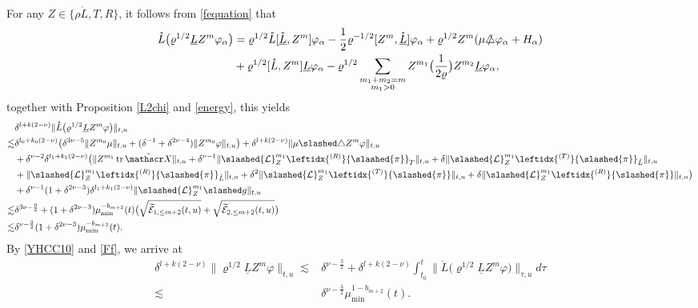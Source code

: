 \documentclass[11pt,twoside]{article}
\def\al{\alpha}
\def\de{\delta}
\def\vp{\varphi}
\def\f{\frac}
\begin{document}
For any $Z\in\{\rho\mathring L, T, R\}$, it follows from \eqref{fequation} that
\begin{equation*}
\begin{split}
 \mathring{L}\bigl(\varrho^{1/2}\underline{L}{Z}^m \vp_\al \bigr)
&=\varrho^{1/2}\mathring L[\mathring{\underline L},Z^m]\vp_\al- \f12\varrho^{-1/2}[Z^m,\mathring {\underline L}]\vp_{\al}+
\varrho^{1/2}{Z}^m (\mu\slashed\triangle\vp_\al+H_\al )\\
&+ \varrho^{1/2}[\mathring{L}, {Z}^m] \underline{L} \vp_\al
- \varrho^{1/2}\sum_{\substack{m_1 + m_2 = m \\ m_1 > 0}}{Z}^{m_1}\big(\frac{1}{2\varrho}\big){Z}^{m_2} \underline{L}\vp_\al,
\end{split}
\end{equation*}
together with Proposition \ref{L2chi} and \eqref{energy}, this yields
\begin{align}
&\delta^{l+k(2-\nu)}\|\mathring{L}\bigl(\varrho^{1/2}\underline{L}{Z}^m \vp\bigr)\|_{t,u}\nonumber\\
\lesssim&\delta^{l_0+k_0(2-\nu)}\bigl(\de^{3\nu-5}\|Z^{m_0}\mu\|_{t,u}+(\delta^{-1}+\delta^{2\nu-4})\|Z^{m_0}\vp\|_{t,u}\bigr)
+\delta^{l+k(2-\nu)}\|\mu\slashed\triangle Z^m\vp\|_{t,u}\nonumber\\
&+\delta^{\nu-2}\delta^{l_1+k_1(2-\nu)}\bigl(\|Z^{m_1}\operatorname{tr}\check{\mathscr X}\|_{t,u}+\delta^{\nu-1}\|\slashed{\mathcal{L}}_{{Z}}^{m_1}\leftidx{^{(R)}}{\slashed{\pi}}_T\|_{t,u}
+\delta\|\slashed{\mathcal{L}}_{{Z}}^{m_1}\leftidx{^{(T)}}{\slashed{\pi}}_{\mathring L}\|_{t,u}\nonumber\\
&+\|\slashed{\mathcal{L}}_{{Z}}^{m_1}\leftidx{^{(R)}}{\slashed{\pi}}_{\mathring L}\|_{t,u}+\delta^{2}\|\slashed{\mathcal{L}}_{{Z}}^{m_1}\leftidx{^{(T)}}{\slashed{\pi}}\|_{t,u}
+\delta\|\slashed{\mathcal{L}}_{{Z}}^{m_1}\leftidx{^{(R)}}{\slashed{\pi}}\|_{t,u}\bigr)\nonumber\\
&+\delta^{\nu-1}(1+\delta^{2\nu-3})\delta^{l_1+k_1(2-\nu)}\|\slashed{\mathcal{L}}_{{Z}}^{m_1}\slashed g\|_{t,u}\nonumber\\
\lesssim&\delta^{3\nu-\f92}+(1+\delta^{2\nu-3})\mu_{\min}^{-b_{m+2}}(t)\bigl( \sqrt{\widetilde{\mathcal{E}}_{1,\leq m+2}(t,u)} + \sqrt{\widetilde{\mathcal{E}}_{2,\leq m+2}(t,u)}\bigr)\nonumber\\
\lesssim&\delta^{\nu-\f32}(1+\delta^{2\nu-3})\mu_{\min}^{-b_{m+2}}(t).\label{YHCC10}
\end{align}
By \eqref{YHCC10} and \eqref{Ff}, we arrive at
\begin{equation}\label{E2m+1}
\begin{split}
\delta^{l+k(2-\nu)}\|\varrho^{1/2}\underline{L}{Z}^m \vp\|_{t,u}
\lesssim&\delta^{\nu-\f32}+\delta^{l+k(2-\nu)}\int_{t_0}^t\|\mathring{L}\bigl(\varrho^{1/2}\underline{L}{Z}^m \vp\bigr)\|_{\tau,u}d\tau\\
\lesssim&\delta^{\nu-\f32}\mu_{\min}^{1-b_{m+2}}(t).
\end{split}
\end{equation}
\end{document}
